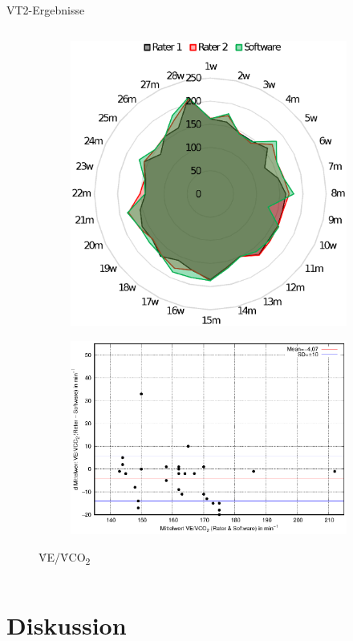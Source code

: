 \documentclass[colorBG,slideColor,8pt]{beamer}
\newcommand{\vcotwo}{\.{V}CO\textsubscript{2}}
\newcommand{\ve}{\.{V}E}
\begin{document}
\begin{frame}[fragile]{VT2-Ergebnisse}
\begin{columns}
\begin{column}{0.5\linewidth}
\begin{figure}
\begin{subfigure}{0.9\linewidth}
				\includegraphics[width=0.6\linewidth]{Bilder/vevco2_net.eps}
			\end{subfigure}
			\begin{subfigure}{0.9\linewidth}
				\centering
				\includegraphics[width=0.82\linewidth]{Bilder/vevco2.eps}
			\end{subfigure}	
		\caption{\ve/\vcotwo}
		\end{figure}
	\end{column}
\end{columns}
\end{frame}

\section{Diskussion}
\end{document}
